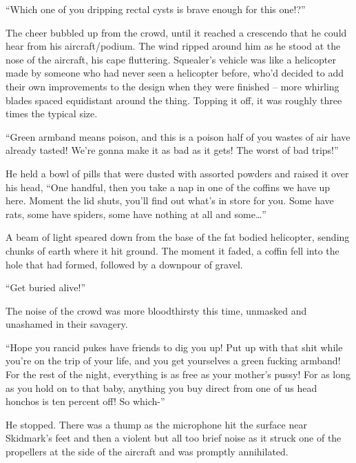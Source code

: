 
``Which one of you dripping rectal cysts is brave enough for this one!?''



The cheer bubbled up from the crowd, until it reached a crescendo that he could hear from his aircraft/podium.  The wind ripped around him as he stood at the nose of the aircraft, his cape fluttering.  Squealer's vehicle was like a helicopter made by someone who had never seen a helicopter before, who'd decided to add their own improvements to the design when they were finished – more whirling blades spaced equidistant around the thing.  Topping it off, it was roughly three times the typical size.



``Green armband means poison, and this is a poison half of you wastes of air have already tasted!  We're gonna make it as bad as it gets!  The worst of bad trips!''



He held a bowl of pills that were dusted with assorted powders and raised it over his head, ``One handful, then you take a nap in one of the coffins we have up here.  Moment the lid shuts, you'll find out what's in store for you.  Some have rats, some have spiders, some have nothing at all and some\ldots''



A beam of light speared down from the base of the fat bodied helicopter, sending chunks of earth where it hit ground.  The moment it faded, a coffin fell into the hole that had formed, followed by a downpour of gravel.



``Get buried alive!''



The noise of the crowd was more bloodthirsty this time, unmasked and unashamed in their savagery.



``Hope you rancid pukes have friends to dig you up!  Put up with that shit while you're on the trip of your life, and you get yourselves a green fucking armband!  For the rest of the night, everything is as free as your mother's pussy!  For as long as you hold on to that baby, anything you buy direct from one of us head honchos is ten percent off!  So which-''



He stopped.  There was a thump as the microphone hit the surface near Skidmark's feet and then a violent but all too brief noise as it struck one of the propellers at the side of the aircraft and was promptly annihilated.



